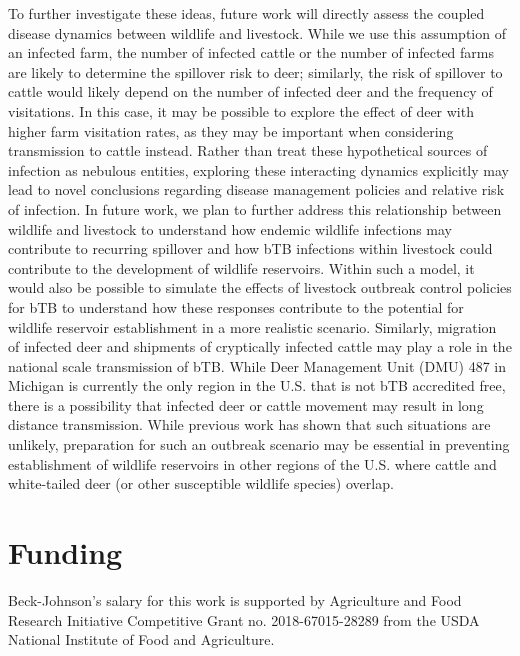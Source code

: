 \documentclass[number,preprint,review,12pt]{elsarticle}
\begin{document}
To further investigate these ideas, future work will directly assess the coupled disease dynamics between wildlife and livestock. While we use this assumption of an infected farm, the number of infected cattle or the number of infected farms are likely to determine the spillover risk to deer; similarly, the risk of spillover to cattle would likely depend on the number of infected deer and the frequency of visitations. In this case, it may be possible to explore the effect of deer with higher farm visitation rates, as they may be important when considering transmission to cattle instead. Rather than treat these hypothetical sources of infection as nebulous entities, exploring these interacting dynamics explicitly may lead to novel conclusions regarding disease management policies and relative risk of infection. In future work, we plan to further address this relationship between wildlife and livestock to understand how endemic wildlife infections may contribute to recurring spillover and how bTB infections within livestock could contribute to the development of wildlife reservoirs. Within such a model, it would also be possible to simulate the effects of livestock outbreak control policies for bTB to understand how these responses contribute to the potential for wildlife reservoir establishment in a more realistic scenario. Similarly, migration of infected deer and shipments of cryptically infected cattle may play a role in the national scale transmission of bTB. While Deer Management Unit (DMU) 487 in Michigan is currently the only region in the U.S. that is not bTB accredited free, there is a possibility that infected deer or cattle movement may result in long distance transmission. While previous work has shown that such situations are unlikely, preparation for such an outbreak scenario may be essential in preventing establishment of wildlife reservoirs in other regions of the U.S. where cattle and white-tailed deer (or other susceptible wildlife species) overlap. 




\pagebreak
\section{Funding} 
Beck-Johnson’s salary for this work is supported by Agriculture and Food Research Initiative Competitive Grant no. 2018-67015-28289 from the USDA National Institute of Food and Agriculture.
\end{document}
